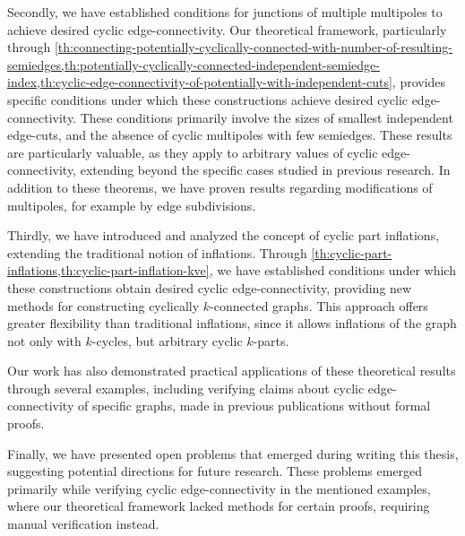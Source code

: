 \documentclass[12pt, twoside]{book}
\begin{document}
Secondly, we have established conditions for junctions of multiple multipoles to achieve desired cyclic edge-connectivity. Our theoretical framework, particularly through \cref{th:connecting-potentially-cyclically-connected-with-number-of-resulting-semiedges,th:potentially-cyclically-connected-independent-semiedge-index,th:cyclic-edge-connectivity-of-potentially-with-independent-cuts}, provides specific conditions under which these constructions achieve desired cyclic edge-connectivity. These conditions primarily involve the sizes of smallest independent edge-cuts, and the absence of cyclic multipoles with few semiedges. These results are particularly valuable, as they apply to arbitrary values of cyclic \mbox{edge-connectivity}, extending beyond the specific cases studied in previous research. In addition to these theorems, we have proven results regarding modifications of multipoles, for example by edge subdivisions.

Thirdly, we have introduced and analyzed the concept of cyclic part inflations, extending the traditional notion of inflations. Through \cref{th:cyclic-part-inflations,th:cyclic-part-inflation-kve}, we have established conditions under which these constructions obtain desired cyclic \mbox{edge-connectivity}, providing new methods for constructing cyclically $k$-connected graphs. This approach offers greater flexibility than traditional inflations, since it allows inflations of the graph not only with $k$-cycles, but arbitrary cyclic $k$-parts.

Our work has also demonstrated practical applications of these theoretical results through several examples, including verifying claims about cyclic edge-connectivity of specific graphs, made in previous publications without formal proofs.

Finally, we have presented open problems that emerged during writing this thesis, suggesting potential directions for future research. These problems emerged primarily while verifying cyclic edge-connectivity in the mentioned examples, where our theoretical framework lacked methods for certain proofs, requiring manual verification instead.

\newpage
\thispagestyle{empty}




\end{document}
